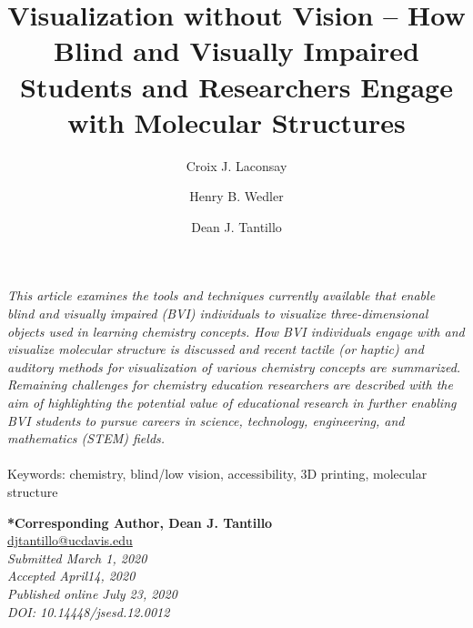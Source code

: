 \documentclass[11.5pt]{sig-alternate} %
\makeatletter
\let\oldabstract\abstract
\let\oldendabstract\endabstract
\renewenvironment{abstract} %
{\renewenvironment{quotation}%
               {\list{}{\addtolength{\leftmargin}{1em} %
                        \listparindent 1.5em%
                        \itemindent    \listparindent%
                        \rightmargin   \leftmargin%
                        \parsep        \z@ \@plus\p@}%
                \item\relax}%
               {\endlist}%
\oldabstract}
{\oldendabstract}
\makeatother
\begin{document}
\title{Visualization without Vision – How Blind and Visually Impaired Students and Researchers Engage with Molecular Structures}

\author[1]{\large \color{blue}Croix J. Laconsay}
\author[1]{\large \color{blue}Henry B. Wedler}
\author[1]{\large \color{blue}Dean J. Tantillo}


\toappear{}
\maketitle
\begin{@twocolumnfalse} 
\begin{abstract}
\item 
\textit {This article examines the tools and techniques currently available that enable blind and visually impaired (BVI) individuals to visualize three-dimensional objects used in learning chemistry concepts. How BVI individuals engage with and visualize molecular structure is discussed and recent tactile (or haptic) and auditory methods for visualization of various chemistry concepts are summarized. Remaining challenges for chemistry education researchers are described with the aim of highlighting the potential value of educational research in further enabling BVI students to pursue careers in science, technology, engineering, and mathematics (STEM) fields.}
\\ \\
Keywords: chemistry, blind/low vision, accessibility, 3D printing, molecular structure
\end{abstract}
\end{@twocolumnfalse}


\textbf{*Corresponding Author, Dean J. Tantillo}\\
\href{mailto:djtantillo@ucdavis.edu}{djtantillo@ucdavis.edu} \\
\textit{Submitted  March 1, 2020}\\
\textit{Accepted April14, 2020} \\
\textit{Published online July 23, 2020} \\
\textit{DOI: 10.14448/jsesd.12.0012} \\
\pagebreak
\clearpage
\end{document}
